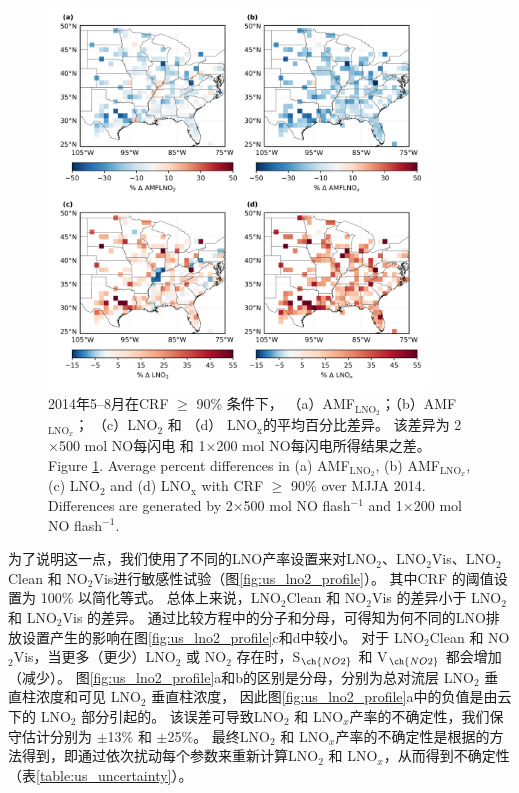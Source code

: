 \begin{figure}[H]
\centering
\includegraphics[width=0.9\textwidth]{./figures/us_simulation_diff.png}
\caption{2014年5--8月在CRF $\geq$ 90\% 条件下，
（a）AMF$_{\textrm{LNO$_2$}}$；（b）AMF$_{\textrm{LNO$_x$}}$；
（c）LNO$_\textrm{2}$ 和 （d） LNO$_\textrm{x}$的平均百分比差异。
该差异为 2$\times$500 mol NO每闪电 和 1$\times$200 mol NO每闪电所得结果之差。\\
Figure \ref{fig:us_simulation_diff}. Average percent differences in (a) AMF$_{\textrm{LNO$_2$}}$, (b) AMF$_{\textrm{LNO$_x$}}$, (c) LNO$_\textrm{2}$ and (d) LNO$_\textrm{x}$ with CRF $\geq$ 90\% over MJJA 2014.
Differences are generated by 2$\times$500 mol NO flash$^{-1}$ and 1$\times$200 mol NO flash$^{-1}$.}
\label{fig:us_simulation_diff}
\end{figure}

为了说明这一点，我们使用了不同的LNO产率设置来对LNO$_2$、LNO$_2$Vis、LNO$_2$Clean 和 NO$_2$Vis进行敏感性试验（图\ref{fig:us_lno2_profile}）。
其中CRF 的阈值设置为 100\% 以简化等式。
总体上来说，LNO$_2$Clean 和 NO$_2$Vis 的差异小于 LNO$_2$ 和 LNO$_2$Vis 的差异。
通过比较方程中的分子和分母，可得知为何不同的LNO排放设置产生的影响在图\ref{fig:us_lno2_profile}c和d中较小。
对于 LNO$_2$Clean 和 NO$_2$Vis，当更多（更少）LNO$_2$ 或 NO$_2$ 存在时，S$_{\ch{NO2}}$ 和 V$_{\ch{NO2}}$ 都会增加（减少）。
图\ref{fig:us_lno2_profile}a和b的区别是分母，分别为总对流层 LNO$_2$ 垂直柱浓度和可见 LNO$_2$ 垂直柱浓度，
因此图\ref{fig:us_lno2_profile}a中的负值是由云下的 LNO$_2$ 部分引起的。
该误差可导致LNO$_2$ 和 LNO$_x$产率的不确定性，我们保守估计分别为 $\pm$13\% 和 $\pm$25\%。
最终LNO$_2$ 和 LNO$_x$产率的不确定性是根据\citet{Pickering.2016,Allen.2019,Bucsela.2019,Lapierre.2020}的方法得到，即通过依次扰动每个参数来重新计算LNO$_2$ 和 LNO$_x$，从而得到不确定性（表\ref{table:us_uncertainty}）。


